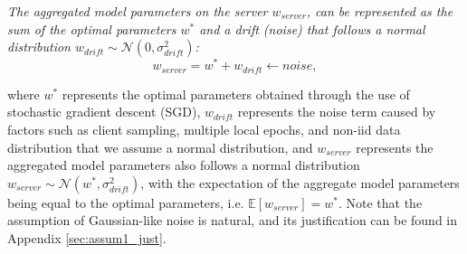 \begin{assumption}\label{assum:drift}
   \textit{The aggregated model parameters on the server $w_{server}$, can be represented as the sum of the optimal parameters $w^*$ and a drift (noise) that follows a normal distribution ${w}_{drift} \sim \mathcal{N}(0,\sigma_{drift}^2)$:}
   \begin{equation}\label{eq:drift}
      {w}_{server}={w}^*+{w}_{drift}\leftarrow noise,
   \end{equation}
\end{assumption}
where $w^*$ represents the optimal parameters obtained through the use of stochastic gradient descent (SGD), $w_{drift}$ represents the noise term caused by factors such as client sampling, multiple local epochs, and non-iid data distribution that we assume a normal distribution, and $w_{server}$ represents the aggregated model parameters also follows a normal distribution ${w}_{server} \sim \mathcal{N}(w^*,\sigma_{drift}^2)$, with the expectation of the aggregate model parameters being equal to the optimal parameters, i.e. $\mathbb{E}[{w}_{server}]={w}^*$. Note that the assumption of Gaussian-like noise is natural, and its justification can be found in Appendix \ref{sec:assum1_just}.

